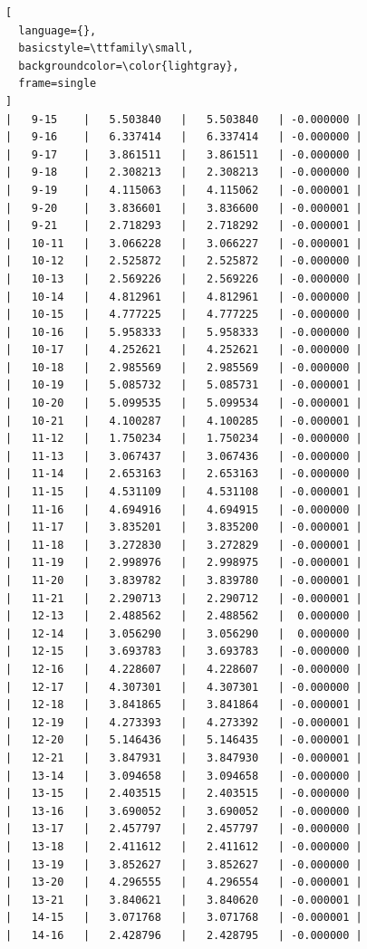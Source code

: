 \documentclass{article}
\begin{document}
\begin{lstlisting}[
  language={},
  basicstyle=\ttfamily\small,
  backgroundcolor=\color{lightgray},
  frame=single
]
|   9-15    |   5.503840   |   5.503840   | -0.000000 |
|   9-16    |   6.337414   |   6.337414   | -0.000000 |
|   9-17    |   3.861511   |   3.861511   | -0.000000 |
|   9-18    |   2.308213   |   2.308213   | -0.000000 |
|   9-19    |   4.115063   |   4.115062   | -0.000001 |
|   9-20    |   3.836601   |   3.836600   | -0.000001 |
|   9-21    |   2.718293   |   2.718292   | -0.000001 |
|   10-11   |   3.066228   |   3.066227   | -0.000001 |
|   10-12   |   2.525872   |   2.525872   | -0.000000 |
|   10-13   |   2.569226   |   2.569226   | -0.000000 |
|   10-14   |   4.812961   |   4.812961   | -0.000000 |
|   10-15   |   4.777225   |   4.777225   | -0.000000 |
|   10-16   |   5.958333   |   5.958333   | -0.000000 |
|   10-17   |   4.252621   |   4.252621   | -0.000000 |
|   10-18   |   2.985569   |   2.985569   | -0.000000 |
|   10-19   |   5.085732   |   5.085731   | -0.000001 |
|   10-20   |   5.099535   |   5.099534   | -0.000001 |
|   10-21   |   4.100287   |   4.100285   | -0.000001 |
|   11-12   |   1.750234   |   1.750234   | -0.000000 |
|   11-13   |   3.067437   |   3.067436   | -0.000000 |
|   11-14   |   2.653163   |   2.653163   | -0.000000 |
|   11-15   |   4.531109   |   4.531108   | -0.000001 |
|   11-16   |   4.694916   |   4.694915   | -0.000000 |
|   11-17   |   3.835201   |   3.835200   | -0.000001 |
|   11-18   |   3.272830   |   3.272829   | -0.000001 |
|   11-19   |   2.998976   |   2.998975   | -0.000001 |
|   11-20   |   3.839782   |   3.839780   | -0.000001 |
|   11-21   |   2.290713   |   2.290712   | -0.000001 |
|   12-13   |   2.488562   |   2.488562   |  0.000000 |
|   12-14   |   3.056290   |   3.056290   |  0.000000 |
|   12-15   |   3.693783   |   3.693783   | -0.000000 |
|   12-16   |   4.228607   |   4.228607   | -0.000000 |
|   12-17   |   4.307301   |   4.307301   | -0.000000 |
|   12-18   |   3.841865   |   3.841864   | -0.000001 |
|   12-19   |   4.273393   |   4.273392   | -0.000001 |
|   12-20   |   5.146436   |   5.146435   | -0.000001 |
|   12-21   |   3.847931   |   3.847930   | -0.000001 |
|   13-14   |   3.094658   |   3.094658   | -0.000000 |
|   13-15   |   2.403515   |   2.403515   | -0.000000 |
|   13-16   |   3.690052   |   3.690052   | -0.000000 |
|   13-17   |   2.457797   |   2.457797   | -0.000000 |
|   13-18   |   2.411612   |   2.411612   | -0.000000 |
|   13-19   |   3.852627   |   3.852627   | -0.000000 |
|   13-20   |   4.296555   |   4.296554   | -0.000001 |
|   13-21   |   3.840621   |   3.840620   | -0.000001 |
|   14-15   |   3.071768   |   3.071768   | -0.000001 |
|   14-16   |   2.428796   |   2.428795   | -0.000000 |

\end{lstlisting}
\end{document}
